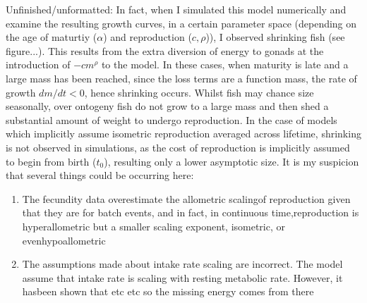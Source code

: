 \documentclass[a4paper]{article} %
\begin{document}
    Unfinished/unformatted:
    In fact, when I simulated this model numerically and examine the resulting growth curves, in a certain parameter space (depending on the age of maturtiy ($\alpha$) and reproduction ($c, \rho$)), I observed shrinking fish (see figure...). This results from the extra diversion of energy to gonads at the introduction of $- cm^\rho$ to the model. In these cases, when maturity is late and a large mass has been reached, since the loss terms are a function mass, the rate of growth $dm/dt < 0$, hence shrinking occurs. Whilst fish may chance size seasonally, over ontogeny fish do not grow to a large mass and then shed a substantial amount of weight to undergo reproduction. In the case of models which implicitly assume isometric reproduction averaged across lifetime, shrinking is not observed in simulations, as the cost of reproduction is implicitly assumed to begin from birth ($t_0$), resulting only a lower asymptotic size. It is my suspicion that several things could be occurring here:
        \begin{enumerate}
            \item The fecundity data \autocite{Barneche2018d} overestimate the allometric scalingof reproduction given that they are for batch events, and in fact, in continuous time,reproduction is hyperallometric but a smaller scaling exponent, isometric, or evenhypoallometric
            \item The assumptions made about intake rate scaling are incorrect. The \cite{West2001}model assume that intake rate is scaling with resting metabolic rate. However, it hasbeen shown that \autocite{Pawar2012} etc etc so the missing energy comes from there
        \end{enumerate}
        
\end{document}
